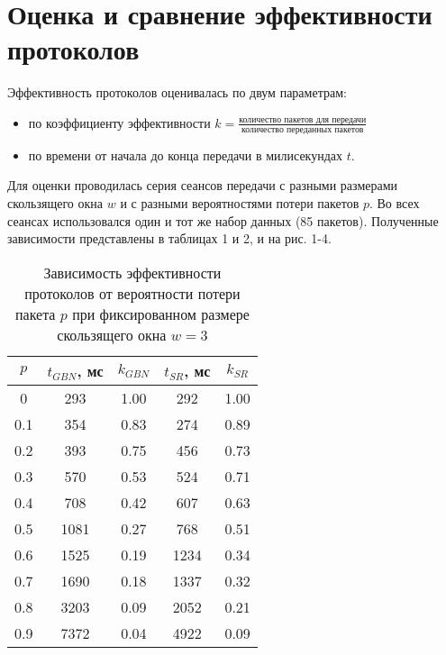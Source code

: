 \documentclass{report}
\begin{document}
\section{Оценка и сравнение эффективности протоколов}
Эффективность протоколов оценивалась по двум параметрам:
\begin{itemize}
\item по коэффициенту эффективности $k = \frac{\mbox{количество пакетов для передачи}}{\mbox{количество переданных пакетов}}$
\item по времени от начала до конца передачи в милисекундах $t$.
\end{itemize}
Для оценки проводилась серия сеансов передачи с разными размерами скользящего окна $w$ и с разными вероятностями потери пакетов $p$. Во всех сеансах использовался один и тот же набор данных (85 пакетов). Полученные зависимости представлены в таблицах 1 и 2, и на рис. 1-4.
\begin{table}[h]
\centering
\begin{tabular}{ |c|c|c|c|c| }
 \hline
 $p$ & $t_{GBN}$, мс & $k_{GBN}$ & $t_{SR}$, мс & $k_{SR}$ \\ [0.5ex] 
 \hline
 0 & 293 & 1.00 & 292 & 1.00 \\ 
 0.1 & 354 & 0.83 & 274 & 0.89 \\ 
 0.2 & 393 & 0.75 & 456 & 0.73 \\ 
 0.3 & 570 & 0.53 & 524 & 0.71 \\ 
 0.4 & 708 & 0.42 & 607 & 0.63 \\ 
 0.5 & 1081 & 0.27 & 768 & 0.51 \\ 
 0.6 & 1525 & 0.19 & 1234 & 0.34 \\ 
 0.7 & 1690 & 0.18 & 1337 & 0.32 \\ 
 0.8 & 3203 & 0.09 & 2052 & 0.21 \\ 
 0.9 & 7372 & 0.04 & 4922 & 0.09 \\ 
 \hline
\end{tabular}
\captionsetup{justification=centering}
\caption{Зависимость эффективности протоколов от вероятности потери пакета $p$ при фиксированном размере скользящего окна $w=3$}
\end{table}
\end{document}
